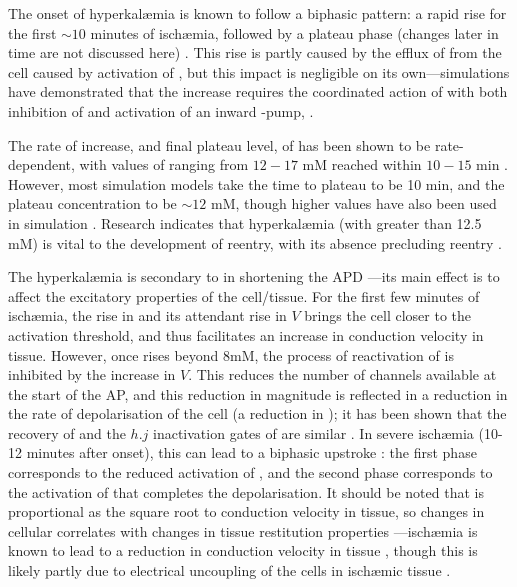 \documentclass[../thesis-main.tex]{subfiles}
\begin{document}
The onset of hyperkal\ae{}mia is known to follow a biphasic pattern: a rapid rise for the first $\sim10$ minutes of isch\ae{}mia, followed by a plateau phase (changes later in time are not discussed here) \citep{Wilde1988}. This rise is partly caused by the efflux of \K{} from the cell caused by activation of \ikatp{}, but this impact is negligible on its own---simulations have demonstrated that the increase requires the coordinated action of \ikatp{} with both inhibition of \inak{} and activation of an inward \na{}-pump, \inas{} \citep{Rodriguez2001, Rodriguez2001a, Rodriguez2002, Terkildsen2007}.

The rate of increase, and final plateau level, of \ko{} has been shown to be rate-dependent, with values of \ko{} ranging from $12-17$ mM reached within $10-15$ min \citep{Rodriguez2002, Coetzee1987}. However, most simulation models take the time to plateau to be 10 min, and the plateau concentration to be $\sim12$ mM, though higher values have also been used in simulation \citep{Ferrero2003a, Trenor2007}. Research indicates that hyperkal\ae{}mia (with \ko{} greater than 12.5 mM) is vital to the development of reentry, with its absence precluding reentry \citep{Ferrero2003}.

The hyperkal\ae{}mia is secondary to \ikatp{} in shortening the APD \citep{Gasser1990}---its main effect is to affect the excitatory properties of the cell/tissue. For the first few minutes of isch\ae{}mia, the rise in \ko{} and its attendant rise in $V$ brings the cell closer to the activation threshold, and thus facilitates an increase in conduction velocity in tissue. However, once \ko{} rises beyond 8mM, the process of reactivation of \ina{} is inhibited by the increase in $V$. This reduces the number of \ina{} channels available at the start of the AP, and this reduction in \ina{} magnitude is reflected in a reduction in the rate of depolarisation of the cell (a reduction in \dvdtmax{}); it has been shown that the recovery of \dvdtmax{} and the $h.j$ inactivation gates of \ina{} are similar \citep{Shaw1997}. In severe isch\ae{}mia (10-12 minutes after onset), this can lead to a biphasic upstroke \citep{Barrett1997}: the first phase corresponds to the reduced activation of \ina{}, and the second phase corresponds to the activation of \ica{} that completes the depolarisation. It should be noted that \dvdtmax{} is proportional as the square root to conduction velocity in tissue, so changes in cellular \dvdtmax{} correlates with changes in tissue restitution properties \citep{Kleber2004, Walton1983, Tasaki1957}---isch\ae{}mia is known to lead to a reduction in conduction velocity in tissue \citep{Caldwell2007}, though this is likely partly due to electrical uncoupling of the cells in isch\ae{}mic tissue \citep{Kleber1987}.
\end{document}
